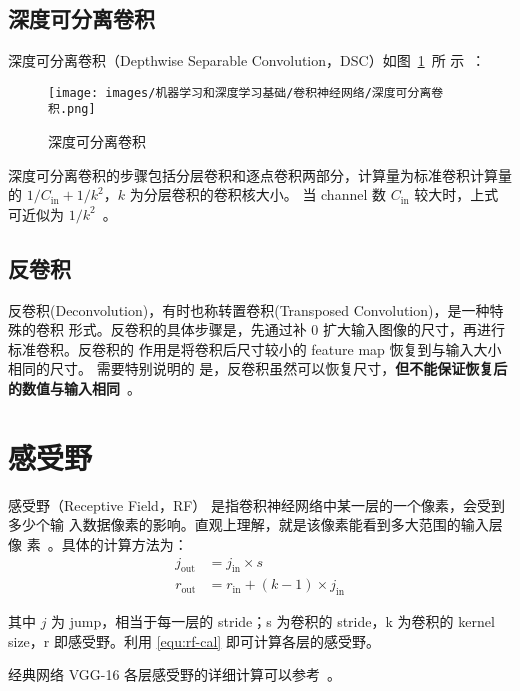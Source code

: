 \subsection{深度可分离卷积}

深度可分离卷积（Depthwise Separable Convolution，DSC）如图~\ref{fig:ds-conv}~所
示~：

\begin{figure}[ht]
  \centering
  \texttt{[image: images/机器学习和深度学习基础/卷积神经网络/深度可分离卷积.png]}
  \caption{深度可分离卷积}
  \label{fig:ds-conv}
\end{figure}

深度可分离卷积的步骤包括分层卷积和逐点卷积两部分，计算量为标准卷积计算量的 $ 1 /
C_{\mathrm{in}} + 1/k^2 $，$k$ 为分层卷积的卷积核大小。
当 channel 数 $C_{\mathrm{in}}$ 较大时，上式可近似为 $1 / k^2$~。

\subsection{反卷积}

反卷积(Deconvolution)，有时也称转置卷积(Transposed Convolution)，是一种特殊的卷积
形式。反卷积的具体步骤是，先通过补 0 扩大输入图像的尺寸，再进行标准卷积。反卷积的
作用是将卷积后尺寸较小的 feature map 恢复到与输入大小相同的尺寸。 需要特别说明的
是，反卷积虽然可以恢复尺寸，\textbf{但不能保证恢复后的数值与输入相同}~。

\section{感受野}

感受野（Receptive Field，RF） 是指卷积神经网络中某一层的一个像素，会受到多少个输
入数据像素的影响。直观上理解，就是该像素能看到多大范围的输入层像
素~。具体的计算方法为：
\begin{align}
\label{equ:rf-cal}
j_{\mathrm {out}} & = j_{\mathrm{in}} \times s \\
r_{\mathrm {out}} & = r_{\mathrm{in}} + (k-1) \times j_{\mathrm{in}}
\end{align}

其中 $j$ 为 jump，相当于每一层的 stride；s 为卷积的 stride，k 为卷积的 kernel
size，r 即感受野。利用 \eqref{equ:rf-cal} 即可计算各层的感受野。

经典网络 VGG-16 各层感受野的详细计算可以参考~。

